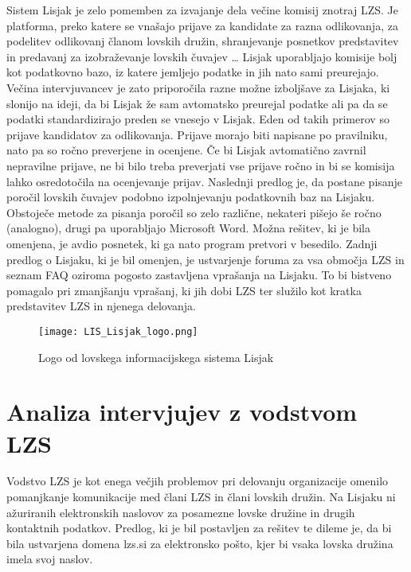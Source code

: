 \documentclass[a4paper,12pt,openright]{book}
\begin{document}
Sistem Lisjak je zelo pomemben za izvajanje dela večine komisij znotraj LZS. 
Je platforma, preko katere se vnašajo prijave za kandidate za razna odlikovanja, za podelitev odlikovanj članom lovskih družin, shranjevanje posnetkov predstavitev in predavanj za izobraževanje lovskih čuvajev …
Lisjak uporabljajo komisije bolj kot podatkovno bazo, iz katere jemljejo podatke in jih nato sami preurejajo. 
Večina intervjuvancev je zato priporočila razne možne izboljšave za Lisjaka, ki slonijo na ideji, da bi Lisjak že sam avtomatsko preurejal podatke ali pa da se podatki standardizirajo preden se vnesejo v Lisjak.  
Eden od takih primerov so prijave kandidatov za odlikovanja.
Prijave morajo biti napisane po pravilniku, nato pa so ročno preverjene in ocenjene. 
Če bi Lisjak avtomatično zavrnil nepravilne prijave, ne bi bilo treba preverjati vse prijave ročno in bi se komisija lahko osredotočila na ocenjevanje prijav. 
Naslednji predlog je, da postane pisanje poročil lovskih čuvajev podobno izpolnjevanju podatkovnih baz na Lisjaku.
Obstoječe metode za pisanja poročil so zelo različne, nekateri pišejo še ročno (analogno), drugi pa uporabljajo Microsoft Word.
Možna rešitev, ki je bila omenjena, je avdio posnetek, ki ga nato program pretvori v besedilo. 
Zadnji predlog o Lisjaku, ki je bil omenjen, je ustvarjenje foruma za vsa območja LZS in seznam FAQ oziroma pogosto zastavljena vprašanja na Lisjaku. 
To bi bistveno pomagalo pri zmanjšanju vprašanj, ki jih dobi LZS ter služilo kot kratka predstavitev LZS in njenega delovanja.

\begin{figure}[h!]
    \centering
    \captionsetup{skip=5pt} %
    \texttt{[image: LIS\_Lisjak\_logo.png]}
    \caption{Logo od lovskega informacijskega sistema Lisjak \cite{LIS_Lisjak_logo}}
    \label{fig:lis_lisjak_logo}
\end{figure}

\section{Analiza intervjujev z vodstvom LZS}

Vodstvo LZS je kot enega večjih problemov pri delovanju organizacije omenilo pomanjkanje komunikacije med člani LZS in člani lovskih družin.
Na Lisjaku ni ažuriranih elektronskih naslovov za posamezne lovske družine in drugih kontaktnih podatkov. 
Predlog, ki je bil postavljen za rešitev te dileme je, da bi bila ustvarjena domena lzs.si za elektronsko pošto, kjer bi vsaka lovska družina imela svoj naslov. 
\end{document}
